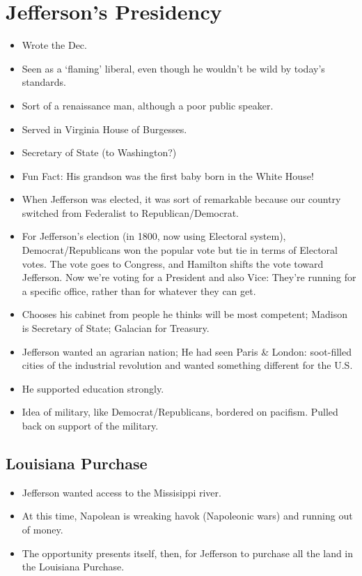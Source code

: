 \documentclass{article}
\begin{document}
    \section{Jefferson's Presidency}
    \begin{itemize}
      \item Wrote the Dec.
      \item Seen as a `flaming' liberal, even though he wouldn't be wild by today's standards.
      \item Sort of a renaissance man, although a poor public speaker. 
      \item Served in Virginia House of Burgesses.
      \item Secretary of State (to Washington?)
      \item Fun Fact: His grandson was the first baby born in the White House!
      \item When Jefferson was elected, it was sort of remarkable because our country switched from Federalist to Republican/Democrat. 
      \item For Jefferson's election (in 1800, now using Electoral system), Democrat/Republicans won the popular vote but tie in terms of Electoral votes. The vote goes to Congress, and Hamilton shifts the vote toward Jefferson. Now we're voting for a President and also Vice: They're running for a specific office, rather than for whatever they can get. 
      \item Chooses his cabinet from people he thinks will be most competent; Madison is Secretary of State; Galacian for Treasury.
      \item Jefferson wanted an agrarian nation; He had seen Paris \& London: soot-filled cities of the industrial revolution and wanted something different for the U.S.
      \item He supported education strongly.
      \item Idea of military, like Democrat/Republicans, bordered on pacifism. Pulled back on support of the military.
    \end{itemize}
    \subsection{Louisiana Purchase}
      \begin{itemize}
        \item Jefferson wanted access to the Missisippi river.
        \item At this time, Napolean is wreaking havok (Napoleonic wars) and running out of money.
        \item The opportunity presents itself, then, for Jefferson to purchase all the land in the Louisiana Purchase. 
      \end{itemize}
\end{document}
